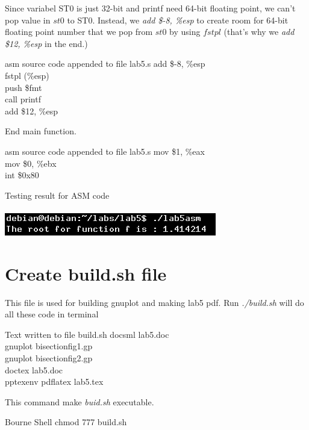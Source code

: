 \documentclass{article}
\begin{document}
\begin{multicols}{2}
Since variabel ST0 is just 32-bit and printf need 64-bit floating point, we can't pop value in $st0$ to ST0. Instead, we \textit{add \$-8, \%esp} to create room for 64-bit floating point number that we pop from $st0$ by using $fstpl$ (that's why we \textit{add \$12, \%esp} in the end.)
\begin{GFT}{asm source code appended to file lab5.s}
\+add \$-8, \%esp\\
\+fstpl (\%esp)\\
\+push \$fmt\\
\+call printf\\
\+add \$12, \%esp\\
\end{GFT}
End main function.
\begin{GFT}{asm source code appended to file lab5.s}
\+mov \$1, \%eax\\
\+mov \$0, \%ebx\\
\+int \$0x80\\
\end{GFT}
\end{multicols}
\clearpage
Testing result for ASM code \\ \\
\includegraphics[scale = 0.8]{lab5asm.png} \\
\section{Create build.sh file}
This file is used for building gnuplot and making lab5 pdf. Run \textit{./build.sh} will do all these code in terminal
\begin{GFT}{Text written to file build.sh}
\+docsml lab5.doc\\
\+gnuplot bisectionfig1.gp\\
\+gnuplot bisectionfig2.gp\\
\+doctex lab5.doc\\
\+pptexenv pdflatex lab5.tex\\
\end{GFT}
This command make \textit{buid.sh} executable.
\begin{GFT}{Bourne Shell}
\+chmod 777 build.sh\\
\end{GFT}
\end{document}
